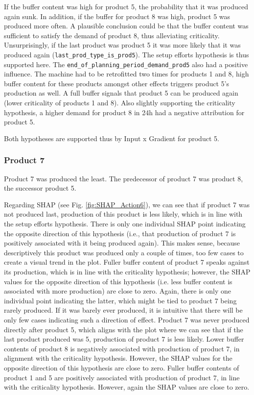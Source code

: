 If the buffer content was high for product 5, the probability that it was produced again sunk. In addition, if the buffer for product 8 was high, product 5 was produced more often. A plausible conclusion could be that the buffer content was sufficient to satisfy the demand of product 8, thus alleviating criticality. Unsurprisingly, if the last product was product 5 it was more likely that it was produced again (\texttt{last\_prod\_type\_is\_prod5}). The setup efforts hypothesis is thus supported here. The \texttt{end\_of\_planning\_period\_demand\_prod5} also had a positive influence. The machine had to be retrofitted two times for products 1 and 8, high buffer content for these products amongst other effects triggers product 5's production as well. A full buffer signals that product 5 can be produced again (lower criticality of products 1 and 8). Also slightly supporting the criticality hypothesis, a higher demand for product 8 in 24h had a negative attribution for product 5.

Both hypotheses are supported thus by Input x Gradient for product 5.

\subsubsection{Product 7}
Product 7 was produced the least. The predecessor of product 7 was
product 8, the successor product 5.

Regarding SHAP (see Fig. \ref{fig:SHAP_Action6}), we can see that if product 7 was not produced last, production of this product is less likely, which is in line with the setup efforts hypothesis. There is only one individual SHAP point indicating the opposite direction of this hypothesis (i.e., that production of product 7 is positively associated with it being produced again). This makes sense, because descriptively this product was produced only a couple of times, too few cases to create a visual trend in
the plot.
Fuller buffer content of product 7 speaks against its production, which is in line with the criticality hypothesis; however, the SHAP values for the opposite direction of this hypothesis (i.e. less buffer content is associated with more production) are close to zero. Again, there is only one individual point indicating the latter, which might be tied to product 7 being rarely produced. If it was barely ever produced, it is intuitive that there will be only few cases indicating such a direction of effect.
Product 7 was never produced directly after product 5, which aligns with the plot where we can see that if the last product produced was 5, production of product 7 is less likely.
Lower buffer contents of product 8 is negatively associated with production of product 7, in alignment with the criticality hypothesis. However, the SHAP values for the opposite direction of this hypothesis are close to zero.
Fuller buffer contents of product 1 and 5 are positively associated with production
of product 7, in line with the criticality hypothesis. However, again the SHAP values are close to zero.

